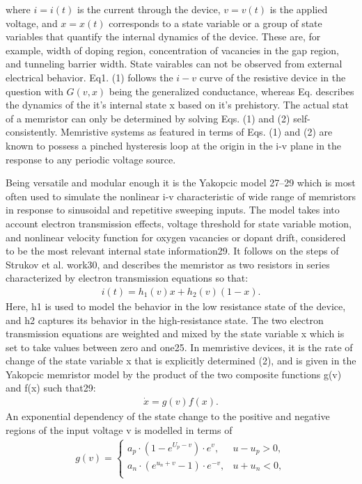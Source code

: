 \documentclass[10pt]{article}
\begin{document}
\begin{multicols}{2}
where $i = i(t)$ is the current through the device, $v = v(t)$
is the applied voltage, and $x = x(t)$ corresponds to a state
variable or a group of state variables that quantify the
internal dynamics of the device. These are, for example,
width of doping region, concentration of vacancies in the gap region, and tunneling barrier width. State vairables can not be observed from external electrical behavior. Eq1. (1) follows the $i-v$ curve of the resistive device in the question with $G(v,x)$ being the generalized conductance, whereas Eq. describes the dynamics of the it's internal state x based on it's prehistory. The actual stat of a memristor can only be determined by solving Eqs. (1) and (2) self-consistently. Memristive systems as featured
in terms of Eqs. (1) and (2) are known to possess a pinched hysteresis loop at the origin in the i-v plane in the response to any periodic voltage source. \par
Being versatile and modular enough it is the Yakopcic model 27–29 which is most often used to simulate
the nonlinear i-v characteristic of wide range of memristors in response to sinusoidal and repetitive sweeping
inputs. The model takes into account electron transmission effects, voltage threshold for state variable motion,
and nonlinear velocity function for oxygen vacancies or
dopant drift, considered to be the most relevant internal
state information29. It follows on the steps of Strukov et
al. work30, and describes the memristor as two resistors
in series characterized by electron transmission equations
so that:
\begin{align}
     i(t) = h_1 (v)x + h_2 (v)(1-x) .
\end{align}
Here, h1 is used to model the behavior in the low resistance state of the device, and h2 captures its behavior in the high-resistance state.
The two electron transmission equations are weighted and mixed by the state
variable x which is set to take values between zero and
one25. In memristive devices, it is the rate of change of
the state variable x that is explicitly determined (2), and
is given in the Yakopcic memristor model by the product
of the two composite functions g(v) and f(x) such that29:
\begin{align}
     \dot{x} = g(v)f(x).
\end{align}
An exponential dependency of the state change to the
positive and negative regions of the input voltage v is
modelled in terms of
\begin{align}{}
     g(v) = \begin{cases} a_p \cdot (1-e^{U_p -v}) \cdot e^v, &u-u_p > 0, \\ a_n \cdot (e^{u_n +v}-1)\cdot e^{-v}, &u+u_n < 0, \\

\end{cases}
\end{align}
\end{multicols}
\end{document}
